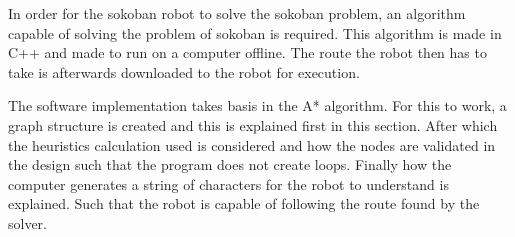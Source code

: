 
In order for the sokoban robot to solve the sokoban problem, an algorithm capable of solving the problem of sokoban is required.
This algorithm is made in C++ and made to run on a computer offline.
The route the robot then has to take is afterwards downloaded to the robot for execution.

The software implementation takes basis in the A* algorithm.
For this to work, a graph structure is created and this is explained first in this section. 
After which the heuristics calculation used is considered and how the nodes are validated in the design such that the program does not create loops.
Finally how the computer generates a string of characters for the robot to understand is explained.
Such that the robot is capable of following the route found by the solver.